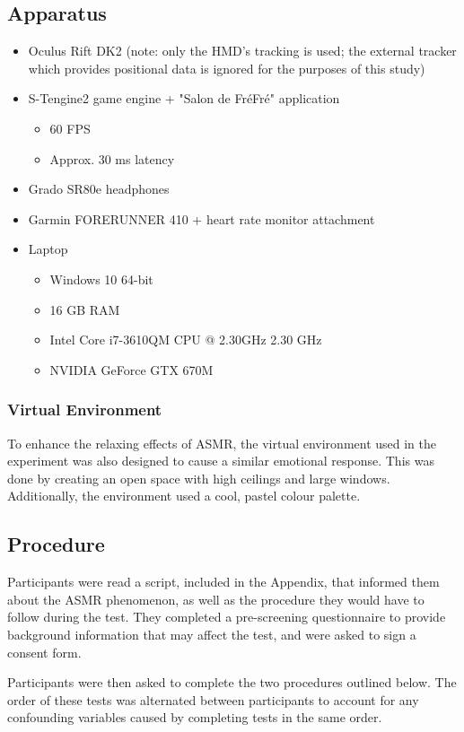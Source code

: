 \documentclass{sigchi}
\begin{document}
\subsection{Apparatus}
\begin{itemize}
\item{Oculus Rift DK2 (note: only the HMD's tracking is used; the external tracker which provides positional data is ignored for the purposes of this study)}
\item{S-Tengine2 game engine + "Salon de Fr\'{e}Fr\'{e}" application
\begin{itemize}
\item{60 FPS}
\item{Approx. 30 ms latency}
\end{itemize}
}
\item{Grado SR80e headphones}
\item{Garmin FORERUNNER 410 + heart rate monitor attachment}
\item{Laptop
\begin{itemize}
\item{Windows 10 64-bit}
\item{16 GB RAM}
\item{Intel Core i7-3610QM CPU @ 2.30GHz 2.30 GHz}
\item{NVIDIA GeForce GTX 670M}
\end{itemize}
}
\end{itemize}
\subsubsection{Virtual Environment}
To enhance the relaxing effects of ASMR, the virtual environment used in the experiment was also designed to cause a similar emotional response. This was done by creating an open space with high ceilings and large windows. Additionally, the environment used a cool, pastel colour palette. 

\subsection{Procedure}
Participants were read a script, included in the Appendix, that informed them about the ASMR phenomenon, as well as the procedure they would have to follow during the test. They completed a pre-screening questionnaire to provide background information that may affect the test, and were asked to sign a consent form.

Participants were then asked to complete the two procedures outlined below. The order of these tests was alternated between participants to account for any confounding variables caused by completing tests in the same order.
\end{document}
